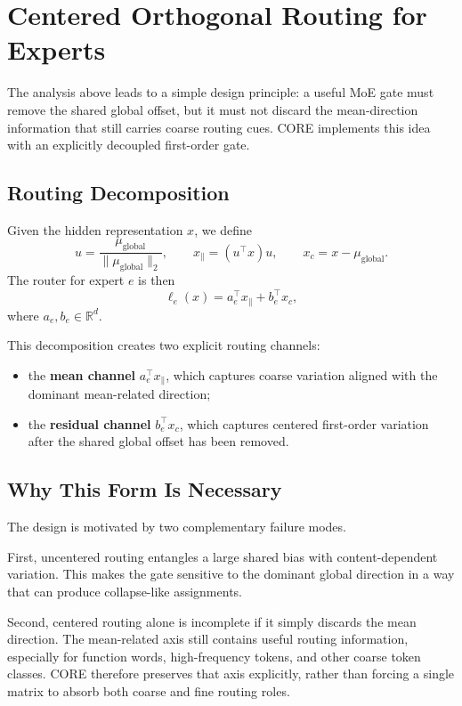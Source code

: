 \section{Centered Orthogonal Routing for Experts}
\label{sec:method}

The analysis above leads to a simple design principle: a useful MoE gate must remove the shared global offset, but it must not discard the mean-direction information that still carries coarse routing cues. CORE implements this idea with an explicitly decoupled first-order gate.

\subsection{Routing Decomposition}
Given the hidden representation $x$, we define
$$
u=\frac{\mu_{\mathrm{global}}}{\|\mu_{\mathrm{global}}\|_2}, \qquad
x_{\parallel}=(u^\top x)u, \qquad
x_c=x-\mu_{\mathrm{global}}.
$$
The router for expert $e$ is then
$$
\ell_e(x)=a_e^\top x_{\parallel}+b_e^\top x_c,
$$
where $a_e,b_e \in \mathbb{R}^d$.

This decomposition creates two explicit routing channels:
\begin{itemize}
    \item the \textbf{mean channel} $a_e^\top x_{\parallel}$, which captures coarse variation aligned with the dominant mean-related direction;
    \item the \textbf{residual channel} $b_e^\top x_c$, which captures centered first-order variation after the shared global offset has been removed.
\end{itemize}

\subsection{Why This Form Is Necessary}
The design is motivated by two complementary failure modes.

First, uncentered routing entangles a large shared bias with content-dependent variation. This makes the gate sensitive to the dominant global direction in a way that can produce collapse-like assignments.

Second, centered routing alone is incomplete if it simply discards the mean direction. The mean-related axis still contains useful routing information, especially for function words, high-frequency tokens, and other coarse token classes. CORE therefore preserves that axis explicitly, rather than forcing a single matrix to absorb both coarse and fine routing roles.


